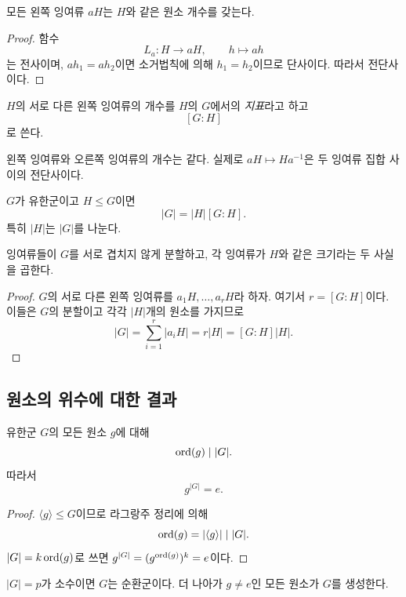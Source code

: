 \begin{proposition}
모든 왼쪽 잉여류 $aH$는 $H$와 같은 원소 개수를 갖는다.
\end{proposition}

\begin{proof}
함수
\[
  L_a:H\to aH,\qquad h\mapsto ah
\]
는 전사이며, $ah_1=ah_2$이면 소거법칙에 의해 $h_1=h_2$이므로 단사이다. 따라서 전단사이다.
\end{proof}

\begin{definition}[지표]
$H$의 서로 다른 왼쪽 잉여류의 개수를 $H$의 $G$에서의 \emph{지표}라고 하고
\[
  [G:H]
\]
로 쓴다.
\end{definition}

왼쪽 잉여류와 오른쪽 잉여류의 개수는 같다. 실제로 $aH\mapsto Ha^{-1}$은 두 잉여류 집합 사이의 전단사이다.

\begin{theorem}[라그랑주 정리]
$G$가 유한군이고 $H\le G$이면
\[
  |G|=|H|[G:H].
\]
특히 $|H|$는 $|G|$를 나눈다.
\end{theorem}

\begin{proofidea}
잉여류들이 $G$를 서로 겹치지 않게 분할하고, 각 잉여류가 $H$와 같은 크기라는 두 사실을 곱한다.
\end{proofidea}

\begin{proof}
$G$의 서로 다른 왼쪽 잉여류를 $a_1H,\dots,a_rH$라 하자. 여기서 $r=[G:H]$이다. 이들은 $G$의 분할이고 각각 $|H|$개의 원소를 가지므로
\[
  |G|=\sum_{i=1}^r|a_iH|=r|H|=[G:H]|H|.
\]
\end{proof}

\subsection{원소의 위수에 대한 결과}

\begin{corollary}
유한군 $G$의 모든 원소 $g$에 대해
\[
  \operatorname{ord}(g)\mid |G|.
\]
따라서
\[
  g^{|G|}=e.
\]
\end{corollary}

\begin{proof}
$\langle g\rangle\le G$이므로 라그랑주 정리에 의해
\[
  \operatorname{ord}(g)=|\langle g\rangle|\mid |G|.
\]
$|G|=k\operatorname{ord}(g)$로 쓰면 $g^{|G|}=(g^{\operatorname{ord}(g)})^k=e$이다.
\end{proof}

\begin{corollary}[소수 위수 군]
$|G|=p$가 소수이면 $G$는 순환군이다. 더 나아가 $g\ne e$인 모든 원소가 $G$를 생성한다.
\end{corollary}

